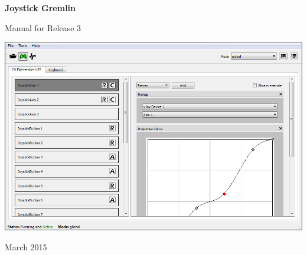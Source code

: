 \begin{titlepage}
\begin{center}
	\vspace*{\fill}
	\vspace*{-3cm}
    \begin{Huge}
        \textbf{Joystick Gremlin}
    \end{Huge}

    \vspace{1cm}

    \begin{Large}
        {Manual for Release 3}
    \end{Large}

    \vspace{3cm}

    \includegraphics[width=0.9\linewidth]{images/main_screen}

    \vspace{6.0cm}

	March 2015
\vspace*{\fill}
\end{center}
\end{titlepage}
